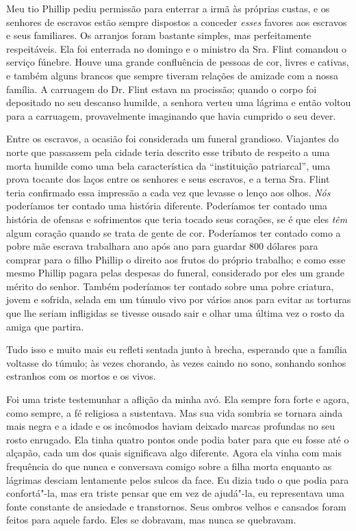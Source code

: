 Meu tio Phillip pediu permissão para
enterrar a irmã às próprias custas, e os senhores de escravos estão
sempre dispostos a conceder \emph{esses} favores aos escravos e seus
familiares. Os arranjos foram bastante simples, mas perfeitamente
respeitáveis. Ela foi enterrada no domingo e o ministro da Sra. Flint
comandou o serviço fúnebre. Houve uma grande confluência de pessoas de
cor, livres e cativas, e também alguns brancos que sempre tiveram
relações de amizade com a nossa família. A carruagem do Dr. Flint estava
na procissão; quando o corpo foi depositado no seu descanso humilde, a
senhora verteu uma lágrima e então voltou para a carruagem,
provavelmente imaginando que havia cumprido o seu dever.

Entre os escravos, a ocasião foi
considerada um funeral grandioso. Viajantes do norte que passassem pela
cidade teria descrito esse tributo de respeito a uma morta humilde como
uma bela característica da ``instituição patriarcal'', uma prova tocante
dos laços entre os senhores e seus escravos, e a terna Sra. Flint teria
confirmado essa impressão a cada vez que levasse o lenço aos olhos.
\emph{Nós} poderíamos ter contado uma história diferente. Poderíamos ter
contado uma história de ofensas e sofrimentos que teria tocado seus
corações, se é que eles \emph{têm} algum coração quando se trata de
gente de cor. Poderíamos ter contado como a pobre mãe escrava trabalhara
ano após ano para guardar 800 dólares para comprar para o filho Phillip
o direito aos frutos do próprio trabalho; e como esse mesmo Phillip
pagara pelas despesas do funeral, considerado por eles um grande mérito
do senhor. Também poderíamos ter contado sobre uma pobre criatura, jovem
e sofrida, selada em um túmulo vivo por vários anos para evitar as
torturas que lhe seriam infligidas se tivesse ousado sair e olhar uma
última vez o rosto da amiga que partira.

Tudo isso e muito mais eu refleti
sentada junto à brecha, esperando que a família voltasse do túmulo; às
vezes chorando, às vezes caindo no sono, sonhando sonhos estranhos com
os mortos e os vivos.

Foi uma triste testemunhar a aflição da
minha avó. Ela sempre fora forte e agora, como sempre, a fé religiosa a
sustentava. Mas sua vida sombria se tornara ainda mais negra e a idade e
os incômodos haviam deixado marcas profundas no seu rosto enrugado. Ela
tinha quatro pontos onde podia bater para que eu fosse até o alçapão,
cada um dos quais significava algo diferente. Agora ela vinha com mais
frequência do que nunca e conversava comigo sobre a filha morta enquanto
as lágrimas desciam lentamente pelos sulcos da face. Eu dizia tudo o que
podia para confortá"-la, mas era triste pensar que em vez de ajudá"-la, eu
representava uma fonte constante de ansiedade e transtornos. Seus ombros
velhos e cansados foram feitos para aquele fardo. Eles se dobravam, mas
nunca se quebravam.

